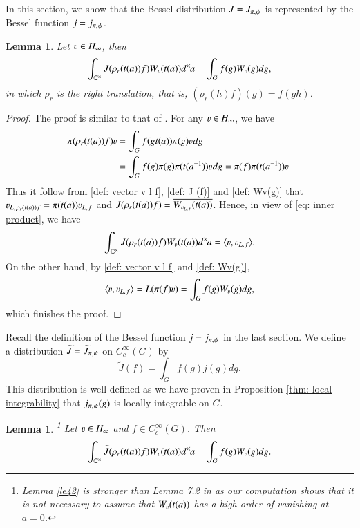 \documentclass{amsproc}
\newcommand{\BC}{{\mathbb {C}}} \newcommand{\BD}{{\mathbb {D}}}
\def\BCx{\BC^{\times}}
\def\shskip{\hskip 0.5 pt}
\def\dx{d^{\times} \hskip -1 pt}
\theoremstyle{plain}
\newtheorem{lem}[thm]{Lemma}  \newtheorem{prop}[thm]{Proposition}
\numberwithin{equation}{section}
\begin{document}
	In this section, we show that the Bessel distribution
	$J=J_{\pi,\shskip \psi}$ %
	  is represented by the Bessel function $j=j_{\pi,\shskip \psi}$. %
	
	\begin{lem}{\label{le41}}
		Let $\varv\in H_\infty$, then
		\[
		\int_{\BCx}J(\rho_r(t(a))f)W_{\varv}(t(a))\dx a=\int_Gf(g)W_{\varv}(g)dg,
		\]
		in which $\rho_r$ is the right translation, that is, $(\rho_r (h) f)(g) = f (  g h)$.
	\end{lem}
   \begin{proof}The proof is similar to that of   \cite[Lemma 7.1]{BaruchMao-Real}.
   For any $\varv\in H_\infty$, we have
   \begin{align*}
    \pi(\rho_r(t(a))f) \varv %
    & =    \int_G f(gt(a))\pi(g) \varv \shskip dg \\
    & =\int_G f(g)\pi(g)\pi(t(a^{-1})) \varv\shskip dg = \pi (f) \pi(t(a^{-1})) \varv.
   \end{align*}
   Thus it follow from  \eqref{def: vector v l f}, \eqref{def: J (f)} and \eqref{def: Wv(g)} that $\varv_{L,\hskip 1 pt \rho_r(t(a))f}=\pi(t(a))\varv_{L, \shskip f}$ and $J (\rho_r(t(a))f)=\overline {W_{\varv_{L, \shskip f}}(t(a))}$. Hence, in view of \eqref{eq: inner product}, we have
   \[
   \int_{\BCx} J (\rho_r(t(a))f)W_\varv(t(a))\dx  a=\langle \varv,\varv_{L, \shskip f} \rangle.
   \]
   On the other hand, by \eqref{def: vector v l f} and \eqref{def: Wv(g)},
   \[
   \langle \varv,\varv_{L, \shskip f} \rangle =L(\pi(f)\varv)=\int_G f(g)W_\varv(g)dg,
   \]
   which finishes the proof.
   \end{proof}
   Recall the definition of the Bessel function $ j = j_{\pi,\shskip \psi} $ in the last section. We define a distribution $\widetilde J = \widetilde J_{\pi,\shskip \psi}$ on $C_c^\infty(G)$ by
   \[
   \widetilde J (f)=\int_{G}f(g)j(g)dg.
   \]	
   This distribution is well defined as we have proven in Proposition \ref{thm: local integrability} that $j_{\pi,\shskip \psi}(g)$ is locally integrable on $G$.
\begin{lem}
{\label{le42}}\footnote{Lemma \ref{le42} is stronger than Lemma 7.2 in \cite{BaruchMao-Real}  as our computation shows that it is not necessary to assume that $W_{\varv} (t(a))$ has  a high order of vanishing at $a = 0$.} Let $\varv\in H_\infty$ and $f\in C_c^\infty(G)$. %
Then
\[
\int_{\BCx} \widetilde J (\rho_r(t(a)) f)W_{\varv}(t(a))\dx  a=\int_G f(g)W_{\varv}(g)dg.
\]
\end{lem}
\end{document}

